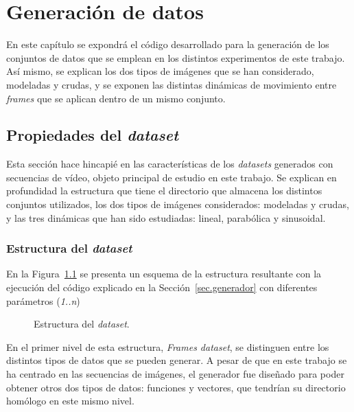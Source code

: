 \chapter{Generación de datos}\label{cap.generacion}

En este capítulo se expondrá el código desarrollado para la generación de los conjuntos de datos que se emplean en los distintos experimentos de este trabajo. Así mismo, se explican los dos tipos de imágenes que se han considerado, modeladas y crudas, y se exponen las distintas dinámicas de movimiento entre \textit{frames} que se aplican dentro de un mismo conjunto.

\section{Propiedades del \textit{dataset}}

Esta sección hace hincapié en las características de los \textit{datasets} generados con secuencias de vídeo, objeto principal de estudio en este trabajo. Se explican en profundidad la estructura que tiene el directorio que almacena los distintos conjuntos utilizados, los dos tipos de imágenes considerados: modeladas y crudas, y las tres dinámicas que han sido estudiadas: lineal, parabólica y sinusoidal.

\subsection{Estructura del \textit{dataset}} \label{ap.estructura}

En la Figura~\ref{fig.estructura_dataset} se presenta un esquema de la estructura resultante con la ejecución del código explicado en la Sección~\ref{sec.generador} con diferentes parámetros (\textit{1..n})

\begin{figure}[H]
	\begin{center}
	    \setlength{\fboxsep}{0.5cm}
	    \caption{Estructura del \textit{dataset}.}
	    \label{fig.estructura_dataset}
	\end{center}
\end{figure}
\vspace{-10pt}
En el primer nivel de esta estructura, \textit{Frames dataset}, se distinguen entre los distintos tipos de datos que se pueden generar. A pesar de que en este trabajo se ha centrado en las secuencias de imágenes, el generador fue diseñado para poder obtener otros dos tipos de datos: funciones y vectores, que tendrían su directorio homólogo en este mismo nivel.\\

